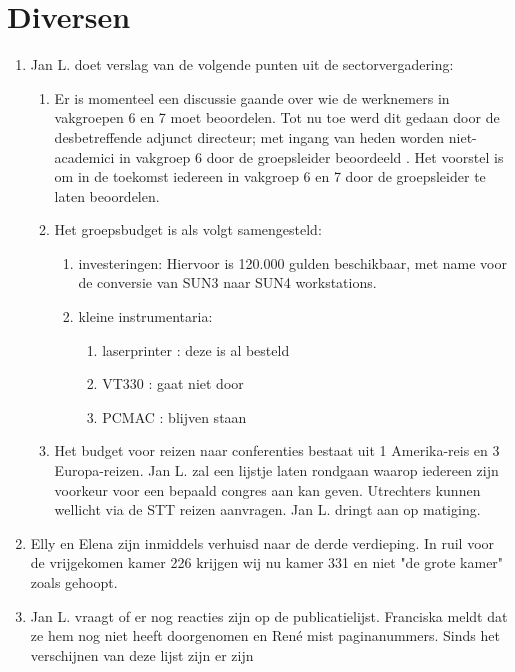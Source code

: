 \section {Diversen}
\begin{enumerate}
   \item Jan L. doet verslag van de volgende punten uit de sectorvergadering:
   \begin{enumerate}
      \item Er is momenteel een discussie gaande over wie de werknemers in 
vakgroepen 6 en 7 moet beoordelen. Tot nu toe werd dit gedaan door 
de desbetreffende adjunct directeur; met ingang van heden worden niet-academici
in 
vakgroep 6 door de groepsleider beoordeeld . Het voorstel is om in de toekomst
iedereen in vakgroep 6 en 7 door de groepsleider te laten beoordelen.
      \item Het groepsbudget is als volgt samengesteld: 
           \begin{enumerate}
   	   \item investeringen: Hiervoor is 120.000 gulden beschikbaar, met 
name voor de conversie van SUN3 naar SUN4 workstations.
           \item kleine instrumentaria:
              \begin{enumerate}
              \item laserprinter : deze is al besteld
              \item VT330 : gaat niet door
              \item PCMAC : blijven staan
              \end{enumerate}
           \end{enumerate}
   \item Het budget voor reizen naar conferenties bestaat uit 1 
Amerika-reis 
en 3 Europa-reizen. Jan L. zal een lijstje laten rondgaan waarop iedereen zijn 
voorkeur voor een bepaald congres aan kan geven. Utrechters kunnen wellicht via
de STT reizen aanvragen. Jan L. dringt aan op matiging.
   \end{enumerate}
   \item Elly en Elena zijn inmiddels verhuisd naar de derde verdieping. In 
         ruil voor de vrijgekomen kamer 226 krijgen wij nu kamer 331 en niet 
         "de grote kamer" zoals gehoopt.
   \item Jan L. vraagt of er nog reacties zijn op de publicatielijst. Franciska
         meldt dat ze hem nog niet heeft doorgenomen en Ren\'{e} mist 
         paginanummers. Sinds het verschijnen van deze lijst zijn er zijn 

\end{enumerate}
